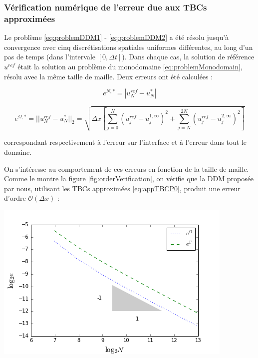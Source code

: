 \subsubsection{Vérification numérique de l'erreur due aux TBCs approximées}

\indent Le problème \eqref{eq:problemDDM1} - \eqref{eq:problemDDM2} a été résolu jusqu'à convergence avec cinq discrétisations spatiales uniformes différentes, au long d'un pas de temps (dans l'intervale $[0,\Delta t]$). Dans chaque cas, la solution de référence $u^{ref}$ était la solution au problème du monodomaine \eqref{eq:problemMonodomain}, résolu avec la même taille de maille. Deux erreurs ont été calculées :

\begin{equation*}
	e^{N,*} = |u^{ref}_N - u^{*}_N|
\end{equation*}

\begin{equation}
	\label{eq:errorDDM}
	e^{\Omega,*} = ||u^{ref}_N - u^{*}_N||_2 = \sqrt{\Delta x \left[ \sum_{j=0}^N{(u^{ref}_j - u^{1,\infty}_j)^2 } + \sum_{j=N}^{2N}{(u^{ref}_j - u^{2,\infty}_j)^2 } \right] }
\end{equation}

\noindent correspondant respectivement à l'erreur sur l'interface et à l'erreur dans tout le domaine.

\indent On s'intéresse au comportement de ces erreurs en fonction de la taille de maille. Comme le montre la figure \ref{fig:orderVerification}, on vérifie que la DDM proposée par nous, utilisant les TBCs approximées \eqref{eq:appTBCP0}, produit une erreur d'ordre $\mathcal{O}(\Delta x)$  :

\begingroup
\begin{center}
	\includegraphics[scale=.5]{figures/convergenceVerificationCorrectN.png}
\end{center}
\endgroup

